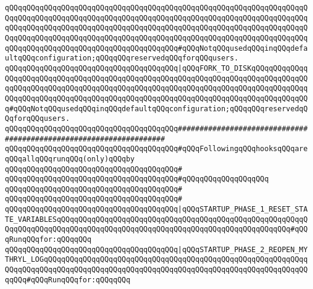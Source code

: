 \verb|qQQqqQQqqQQqqQQqqQQqqQQqqQQqqQQqqQQqqQQqqQQqqQQqqQQqqQQqqQQqqQQqqQQqqQQqqQQqqQQqqQQqqQQqqQQqqQQqqQQqqQQqqQQqqQQqqQQqqQQqqQQqqQQqqQQqqQQqqQQqqQQqqQQqqQQqqQQqqQQqqQQqqQQqqQQqqQQqqQQqqQQqqQQqqQQqqQQqqQQqqQQqqQQqqQQqqQQqqQQqqQQqqQQqqQQqqQQqqQQqqQQqqQQqqQQqqQQqqQQqqQQqqQQqqQQqqQQqqQQqqQQqqQQqqQQqqQQqqQQqqQQqqQQqqQQqqQQqqQQq#qQQqNotqQQqusedqQQqinqQQqdefaultqQQqconfiguration;qQQqqQQqreservedqQQqforqQQqusers.|\newline
\newline
\verb|qQQqqQQqqQQqqQQqqQQqqQQqqQQqqQQqqQQqqQQq|\verb#|qQQqFORK_TO_DISKqQQqqQQqqQQqqQQqqQQqqQQqqQQqqQQqqQQqqQQqqQQqqQQqqQQqqQQqqQQqqQQqqQQqqQQqqQQqqQQqqQQqqQQqqQQqqQQqqQQqqQQqqQQqqQQqqQQqqQQqqQQqqQQqqQQqqQQqqQQqqQQqqQQqqQQqqQQqqQQqqQQqqQQqqQQqqQQqqQQqqQQqqQQqqQQqqQQqqQQqqQQqqQQqqQQqqQQqqQQqqQQq#\verb|#qQQqNotqQQqusedqQQqinqQQqdefaultqQQqconfiguration;qQQqqQQqreservedqQQqforqQQqusers.|\newline
\newline
\newline
\verb|qQQqqQQqqQQqqQQqqQQqqQQqqQQqqQQqqQQqqQQq###################################################################|\newline
\verb|qQQqqQQqqQQqqQQqqQQqqQQqqQQqqQQqqQQqqQQq#qQQqFollowingqQQqhooksqQQqareqQQqallqQQqrunqQQq(only)qQQqby|\newline
\verb|qQQqqQQqqQQqqQQqqQQqqQQqqQQqqQQqqQQqqQQq#|\newline
\verb|qQQqqQQqqQQqqQQqqQQqqQQqqQQqqQQqqQQqqQQq#qQQqqQQqqQQqqQQqqQQq|\newline
\verb|qQQqqQQqqQQqqQQqqQQqqQQqqQQqqQQqqQQqqQQq#|\newline
\verb|qQQqqQQqqQQqqQQqqQQqqQQqqQQqqQQqqQQqqQQq#|\newline
\verb|qQQqqQQqqQQqqQQqqQQqqQQqqQQqqQQqqQQqqQQq|\verb#|qQQqSTARTUP_PHASE_1_RESET_STATE_VARIABLESqQQqqQQqqQQqqQQqqQQqqQQqqQQqqQQqqQQqqQQqqQQqqQQqqQQqqQQqqQQqqQQqqQQqqQQqqQQqqQQqqQQqqQQqqQQqqQQqqQQqqQQqqQQqqQQqqQQqqQQqqQQq#\verb|#qQQqRunqQQqfor:qQQqqQQq|\newline
\verb|qQQqqQQqqQQqqQQqqQQqqQQqqQQqqQQqqQQqqQQq|\verb#|qQQqSTARTUP_PHASE_2_REOPEN_MYTHRYL_LOGqQQqqQQqqQQqqQQqqQQqqQQqqQQqqQQqqQQqqQQqqQQqqQQqqQQqqQQqqQQqqQQqqQQqqQQqqQQqqQQqqQQqqQQqqQQqqQQqqQQqqQQqqQQqqQQqqQQqqQQqqQQqqQQqqQQqqQQq#\verb|#qQQqRunqQQqfor:qQQqqQQq|\newline
